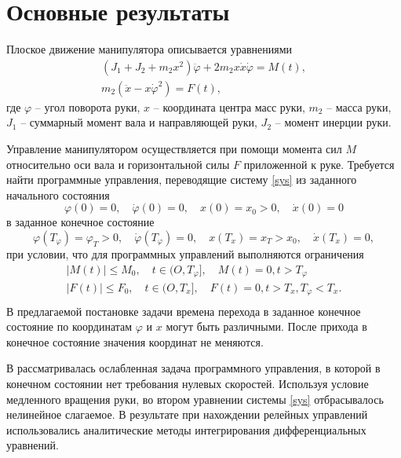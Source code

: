 \section{Основные результаты} %

Плоское движение манипулятора описывается уравнениями \cite{Chernousko}
\begin{equation}
	\begin{gathered}
	 \left( J_1+J_2+m_2 x^2\right)\ddot{\varphi}+2 m_2 x \dot{x} \dot{\varphi} = M(t), \\
	 m_2 \left( \ddot{x}-x \dot{\varphi}^2 \right) = F(t),	
	\end{gathered}
\label{sys}
\end{equation}
где $\varphi$ -- угол поворота руки, $x$ -- координата центра масс руки, $m_2$ -- масса руки, $J_1$ -- суммарный момент вала и направляющей руки, $J_2$ -- момент инерции руки.

Управление манипулятором осуществляется при помощи момента сил $M$ относительно оси вала и горизонтальной силы $F$ приложенной к руке. Требуется найти программные управления, переводящие систему \eqref{sys} из заданного начального состояния
\begin{equation*}
	\varphi(0) = 0, \quad \dot{\varphi}(0) = 0, \quad x(0)=x_0>0, \quad \dot{x}(0)=0
	\label{nachusl}
\end{equation*}
в заданное конечное состояние
\begin{equation*}
	\varphi(T_{\varphi})=\varphi_T>0, \quad \dot{\varphi}(T_{\varphi}) = 0, \quad x(T_x) = x_T > x_0, \quad \dot{x}(T_x)=0,
	\label{endusl} 
\end{equation*}
при условии, что для программных управлений выполняются ограничения
\begin{equation*}
	\begin{gathered}
	|M(t)|\leq M_0, \quad t \in (O, T_{\varphi}], \quad M(t)=0, t > T_{\varphi}\\
	|F(t)|\leq F_0, \quad t \in (O, T_{x}], \quad F(t)=0, t > T_{x}, T_{\varphi}<T_x.\\
	\end{gathered}
\end{equation*}
В предлагаемой постановке задачи времена перехода в заданное конечное состояние по координатам $\varphi$ и $x$ могут быть различными. После прихода в конечное состояние значения координат не меняются.

В \cite{Akulenko} рассматривалась ослабленная задача программного управления, в которой в конечном состоянии нет требования нулевых скоростей. Используя условие медленного вращения руки, во втором уравнении системы \eqref{sys} отбрасывалось нелинейное слагаемое. В результате при нахождении релейных управлений использовались аналитические методы интегрирования дифференциальных уравнений.

